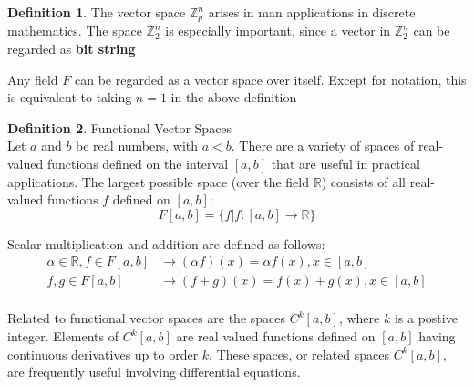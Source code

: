 \documentclass{book}
\theoremstyle{definition}
\newtheorem{definition}{Definition}[section]
\theoremstyle{remark}
\newcommand{\bb}[1]{\mathbb{#1}}
\begin{document}
\begin{definition}
    The vector space $\bb{Z}_p^n$ arises in man applications in discrete mathematics. The space $\bb{Z}_2^n$ is especially important, since a vector in $\bb{Z}_2^n$  can be regarded as \textbf{bit string}\footnotemark
    
    
    Any field $F$ can be regarded as a vector space over itself. Except for notation, this is equivalent to taking $n=1$ in the above definition
\end{definition}


\begin{definition}
Functional Vector Spaces \\

    Let $a$ and $b$ be real numbers, with $a < b$. There are a variety of spaces of real-valued functions defined on the interval $[a,b]$ that are useful in practical applications. The largest possible space (over the field $\bb{R}$) consists of all real-valued functions $f$ defined on $[a,b]$:
        \begin{equation*}
            F[a,b] = \{f|f : [a,b] \to \bb{R}  \}
        \end{equation*}
    
    Scalar multiplication and addition are defined as follows:
        \begin{align*}
            \alpha \in \bb{R}, f \in F[a,b] & \to (\alpha f)(x) = \alpha f(x), x \in [a,b] \\
            f,g \in F[a,b] & \to (f + g)(x) = f(x) + g(x), x \in [a,b] \\
        \end{align*}
    
    Related to functional vector spaces are the spaces $C^k[a,b]$, where $k$ is a postive integer. Elements of $C^k[a,b]$ are real valued functions defined on $[a,b]$ having continuous derivatives up to order $k$. These spaces, or related spaces $C^k[a,b]$, are frequently useful involving differential equations. 
\end{definition}
\end{document}
